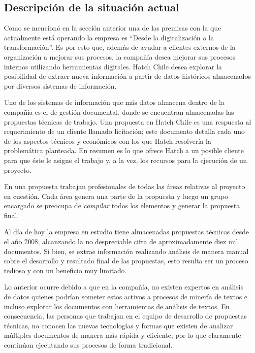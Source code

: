 \subsection{Descripción de la situación actual}
Como se mencionó en la sección anterior una de las premisas con la que actualmente está operando la empresa es “Desde la digitalización a la transformación”. Es por esto que, además de ayudar a clientes externos de la organización a mejorar sus procesos, la compañía desea mejorar sus procesos internos utilizando herramientas digitales. Hatch Chile desea explorar la posibilidad de extraer nueva información a partir de datos históricos almacenados por diversos sistemas de información.

 Uno de los sistemas de información que más datos almacena dentro de la compañía es el de gestión documental, donde se encuentran almacenadas las propuestas técnicas de trabajo. Una propuesta en Hatch Chile es una respuesta al requerimiento de un cliente llamado licitación; este documento detalla cada uno de los aspectos técnicos y económicos con los que Hatch resolvería la problemática planteada. En resumen es lo que ofrece Hatch a un posible cliente para que éste le asigne el trabajo y, a la vez, los recursos para la ejecución de un proyecto. 
 
 En una propuesta trabajan profesionales de todas las áreas relativas al proyecto en cuestión. Cada área genera una parte de la propuesta y luego un grupo encargado se preocupa de \emph{compilar} todos los elementos y generar la propuesta final.

Al día de hoy la empresa en estudio tiene almacenadas propuestas técnicas desde el año 2008, alcanzando la no despreciable cifra de aproximadamente diez mil documentos. Si bien, se extrae información realizando análisis de manera manual sobre el desarrollo y resultado final de las propuestas, esto resulta ser un proceso tedioso y con un beneficio muy limitado.

Lo anterior ocurre debido a que en la compañía, no existen expertos en análisis de datos quienes podrían someter estos activos a procesos de minería de textos e incluso explotar los documentos con herramientas de análisis de textos. En consecuencia, las personas que trabajan en el equipo de desarrollo de propuestas técnicas, no conocen las nuevas tecnologías y formas que existen de analizar múltiples documentos de manera más rápida y eficiente, por lo que claramente continúan ejecutando sus procesos de forma tradicional.


